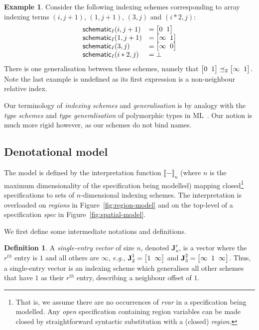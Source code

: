 \documentclass[10pt,preprint]{sigplanconf}
\newcounter{block}
\theoremstyle{definition}
\newtheorem{example}[block]{Example}
\newtheorem{definition}[block]{Definition}
\newcommand{\eg}{\emph{e.g.}}
\newcommand{\interp}[1]{\llbracket{#1}\rrbracket}
\newcommand{\vtwoh}[2]{\setlength{\arraycolsep}{0em}
\left[\begin{array}{cc}#1 \; & \; #2\end{array}\right]}
\newcommand{\vthreeh}[3]{\setlength{\arraycolsep}{0em}
\left[\begin{array}{ccc}#1 \; & \; #2 \; & \; #3\end{array}\right]}
\newcommand{\singleEntry}[2]{\textbf{J}_{#2}^{#1}}
\begin{document}
\begin{example}
Consider the following indexing schemes
corresponding to array indexing terms
$(i, j+1)$, $(1, j+1)$, $(3, j)$ and $(i*2, j)$:
%
\begin{align*}
\begin{array}{ll}
\schemeN{(i, j+1)} & =\vtwoh{0}{1} \\
\schemeN{(1, j+1)} & = \vtwoh{\infty}{1} \\
\schemeN{(3, j)} & = \vtwoh{\infty}{0} \\
\schemeN{(i*2, j)} & = \bot
\end{array}
\end{align*}
There is one generalisation between these
schemes, namely that $\vtwoh{0}{1} \preceq_2 \vtwoh{\infty}{1}$.
Note the last example is undefined as its first expression is a
non-neighbour relative index.
\end{example}

Our terminology of \emph{indexing schemes} and
\emph{generalisation} is by analogy
with the \emph{type schemes} and \emph{type generalisation} of
polymorphic types in ML~\cite{milner1978theory}. Our notion is
much more rigid however, as our schemes do not bind names.

\subsection{Denotational model}

The model is defined by the interpretation function $\interp{-}_n$
(where $n$ is the maximum dimensionality of the specification being
modelled) mapping closed\footnote{That is, we assume there are no
  occurrences of \textit{rvar} in a specification being modelled.  Any
  \emph{open} specification containing region variables can be made
  closed by straightforward syntactic substitution with a (closed)
  \textit{region}.} specifications to sets of
$n$-dimensional indexing schemes. The interpretation is overloaded on
\emph{regions} in Figure~\ref{fig:region-model} and on the top-level
of a specification \textit{spec} in Figure~\ref{fig:spatial-model}.

We first define some intermediate notations and definitions.

\begin{definition}A \emph{single-entry vector} of size $n$, denoted
$\singleEntry{r}{n}$, is a vector where the $r^{th}$ entry is $1$
and all others are $\infty$, \eg{}, $\singleEntry{1}{2} =
\vtwoh{1}{\infty}$ and $\singleEntry{2}{3} = \vthreeh{\infty}{1}{\infty}$.
Thus, a single-entry vector is an indexing scheme which generalises
all other schemes that have $1$ as their $r^{th}$ entry,
describing a neighbour offset of $1$.
\end{definition}
\end{document}
